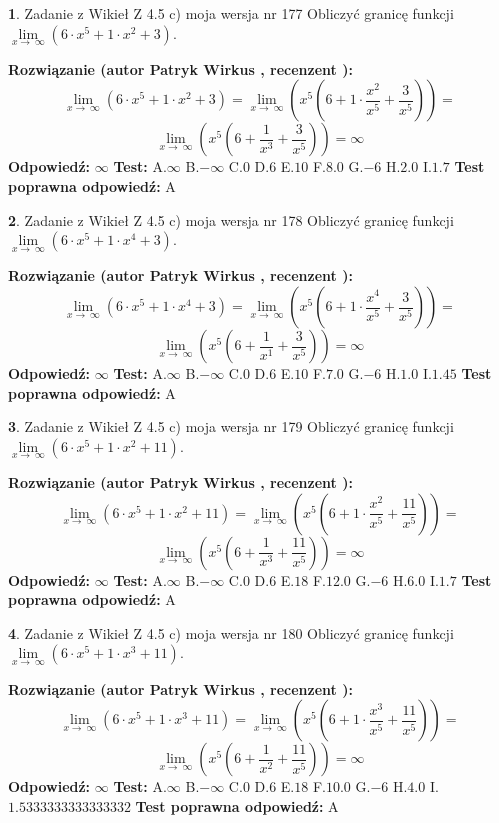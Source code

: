 \documentclass[12pt, a4paper]{article}
\theoremstyle{definition} %
\newtheorem{zad}{}
\newcommand{\zadStart}[1]{\begin{zad}#1\newline}
\newcommand{\zadStop}{\end{zad}}
\newcommand{\rozwStart}[2]{\noindent \textbf{Rozwiązanie (autor #1 , recenzent #2): }\newline}
\newcommand{\rozwStop}{\newline}
\newcommand{\odpStart}{\noindent \textbf{Odpowiedź:}\newline}
\newcommand{\odpStop}{\newline}
\newcommand{\testStart}{\noindent \textbf{Test:}\newline}
\newcommand{\testStop}{\newline}
\newcommand{\kluczStart}{\noindent \textbf{Test poprawna odpowiedź:}\newline}
\newcommand{\kluczStop}{\newline}
\begin{document}
\zadStart{Zadanie z Wikieł Z 4.5 c) moja wersja nr 177}
Obliczyć granicę funkcji  $\lim\limits_{x\to\ \infty}(6 \cdot x^{5}+1 \cdot x^{2}+3)$.
\zadStop
\rozwStart{Patryk Wirkus}{}
$$\lim\limits_{x\to\ \infty}(6 \cdot x^{5}+1 \cdot x^{2}+3) = \lim\limits_{x\to\ \infty}(x^{5}(6 +1 \cdot \frac{x^{2}}{x^{5}}+\frac{3}{x^{5}})) =$$ $$\lim\limits_{x\to\ \infty}(x^{5}(6 +\frac{1}{x^{3}}+\frac{3}{x^{5}})) =\infty$$
\rozwStop
\odpStart
$\infty$
\odpStop
\testStart
A.$\infty$ B.$-\infty$ C.$0$ D.$6$ E.$10$
F.$8.0$ G.$-6$
H.$2.0$
I.$1.7$
\testStop
\kluczStart
A
\kluczStop



\zadStart{Zadanie z Wikieł Z 4.5 c) moja wersja nr 178}
Obliczyć granicę funkcji  $\lim\limits_{x\to\ \infty}(6 \cdot x^{5}+1 \cdot x^{4}+3)$.
\zadStop
\rozwStart{Patryk Wirkus}{}
$$\lim\limits_{x\to\ \infty}(6 \cdot x^{5}+1 \cdot x^{4}+3) = \lim\limits_{x\to\ \infty}(x^{5}(6 +1 \cdot \frac{x^{4}}{x^{5}}+\frac{3}{x^{5}})) =$$ $$\lim\limits_{x\to\ \infty}(x^{5}(6 +\frac{1}{x^{1}}+\frac{3}{x^{5}})) =\infty$$
\rozwStop
\odpStart
$\infty$
\odpStop
\testStart
A.$\infty$ B.$-\infty$ C.$0$ D.$6$ E.$10$
F.$7.0$ G.$-6$
H.$1.0$
I.$1.45$
\testStop
\kluczStart
A
\kluczStop



\zadStart{Zadanie z Wikieł Z 4.5 c) moja wersja nr 179}
Obliczyć granicę funkcji  $\lim\limits_{x\to\ \infty}(6 \cdot x^{5}+1 \cdot x^{2}+11)$.
\zadStop
\rozwStart{Patryk Wirkus}{}
$$\lim\limits_{x\to\ \infty}(6 \cdot x^{5}+1 \cdot x^{2}+11) = \lim\limits_{x\to\ \infty}(x^{5}(6 +1 \cdot \frac{x^{2}}{x^{5}}+\frac{11}{x^{5}})) =$$ $$\lim\limits_{x\to\ \infty}(x^{5}(6 +\frac{1}{x^{3}}+\frac{11}{x^{5}})) =\infty$$
\rozwStop
\odpStart
$\infty$
\odpStop
\testStart
A.$\infty$ B.$-\infty$ C.$0$ D.$6$ E.$18$
F.$12.0$ G.$-6$
H.$6.0$
I.$1.7$
\testStop
\kluczStart
A
\kluczStop



\zadStart{Zadanie z Wikieł Z 4.5 c) moja wersja nr 180}
Obliczyć granicę funkcji  $\lim\limits_{x\to\ \infty}(6 \cdot x^{5}+1 \cdot x^{3}+11)$.
\zadStop
\rozwStart{Patryk Wirkus}{}
$$\lim\limits_{x\to\ \infty}(6 \cdot x^{5}+1 \cdot x^{3}+11) = \lim\limits_{x\to\ \infty}(x^{5}(6 +1 \cdot \frac{x^{3}}{x^{5}}+\frac{11}{x^{5}})) =$$ $$\lim\limits_{x\to\ \infty}(x^{5}(6 +\frac{1}{x^{2}}+\frac{11}{x^{5}})) =\infty$$
\rozwStop
\odpStart
$\infty$
\odpStop
\testStart
A.$\infty$ B.$-\infty$ C.$0$ D.$6$ E.$18$
F.$10.0$ G.$-6$
H.$4.0$
I.$1.5333333333333332$
\testStop
\kluczStart
A
\kluczStop
\end{document}
